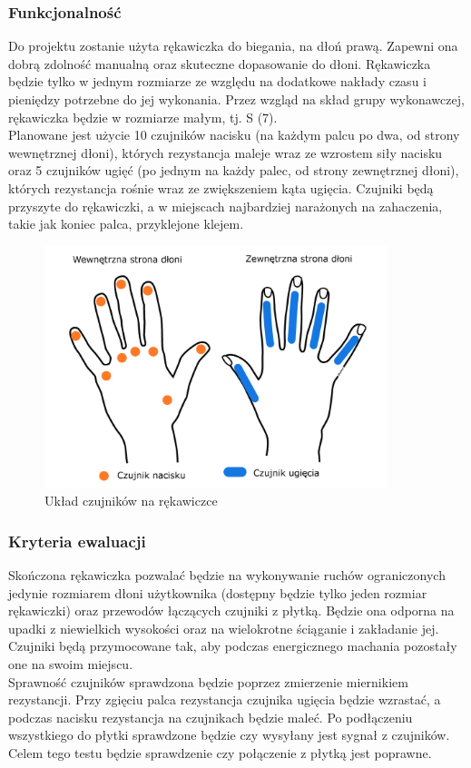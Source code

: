 \documentclass{article}
\begin{document}
\subsubsection{Funkcjonalność}
Do projektu zostanie użyta rękawiczka do biegania, na dłoń prawą. Zapewni ona dobrą zdolność manualną oraz skuteczne dopasowanie do dłoni. Rękawiczka będzie tylko w jednym rozmiarze ze względu na dodatkowe nakłady czasu i pieniędzy potrzebne do jej wykonania. Przez wzgląd na skład grupy wykonawczej, rękawiczka będzie w rozmiarze małym, tj. S (7).\\
Planowane jest użycie 10 czujników nacisku (na każdym palcu po dwa, od strony wewnętrznej dłoni), których rezystancja maleje wraz ze wzrostem siły nacisku oraz 5 czujników ugięć (po jednym na każdy palec, od strony zewnętrznej dłoni), których rezystancja rośnie wraz ze zwiększeniem kąta ugięcia. Czujniki będą przyszyte do rękawiczki, a w miejscach najbardziej narażonych na zahaczenia, takie jak koniec palca, przyklejone klejem. \\

\begin{figure}[h!]
\centering
\includegraphics[width = 10cm]{czujniki.png}
\caption{Układ czujników na rękawiczce}
\label{fig:rozmieszczenie_czujników}
\end{figure}

\subsubsection{Kryteria ewaluacji}
Skończona rękawiczka pozwalać będzie na wykonywanie ruchów ograniczonych jedynie rozmiarem dłoni użytkownika (dostępny będzie tylko jeden rozmiar rękawiczki) oraz przewodów łączących czujniki z płytką. Będzie ona odporna na upadki z niewielkich wysokości oraz na wielokrotne ściąganie i zakładanie jej. Czujniki będą przymocowane tak, aby podczas energicznego machania pozostały one na swoim miejscu.\\
Sprawność czujników sprawdzona będzie poprzez zmierzenie miernikiem rezystancji. Przy zgięciu palca rezystancja czujnika ugięcia będzie wzrastać, a podczas nacisku rezystancja na czujnikach będzie maleć. Po podłączeniu wszystkiego do płytki sprawdzone będzie czy wysyłany jest sygnał z czujników. Celem tego testu będzie sprawdzenie czy połączenie z płytką jest poprawne.
\end{document}
